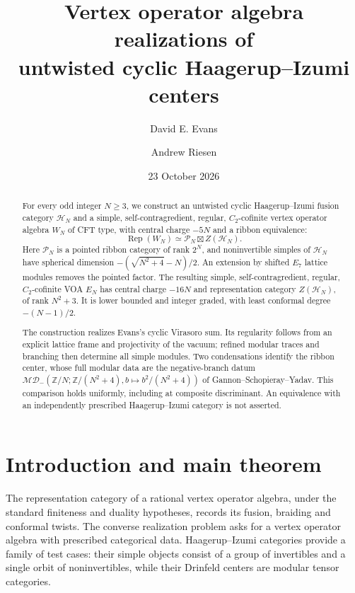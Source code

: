 \documentclass[11pt,a4paper]{article}
\title{\textbf{Vertex operator algebra realizations of\\untwisted cyclic Haagerup--Izumi centers}}
\author{David E. Evans\and Andrew Riesen}
\date{23 October 2026}
\numberwithin{equation}{section}
\theoremstyle{definition}\newtheorem{definition}[theorem]{Definition}
\theoremstyle{remark}\newtheorem{remark}[theorem]{Remark}
\begin{document}
\maketitle
\begin{abstract}
For every odd integer $N\geq3$, we construct an untwisted cyclic
Haagerup--Izumi fusion category $\mathcal H_N$ and a simple,
self-contragredient, regular, $C_2$-cofinite vertex operator algebra
$W_N$ of CFT type, with central charge $-5N$ and a ribbon equivalence:
\[
 \operatorname{Rep}(W_N)\simeq
 \mathcal P_N\boxtimes Z(\mathcal H_N).
\]
Here $\mathcal P_N$ is a pointed ribbon category of rank $2^N$, and
noninvertible simples of $\mathcal H_N$ have spherical dimension
$-(\sqrt{N^2+4}-N)/2$. An extension by shifted $E_7$ lattice modules
removes the pointed factor. The resulting simple, self-contragredient,
regular, $C_2$-cofinite VOA $E_N$ has central charge $-16N$ and
representation category $Z(\mathcal H_N)$, of rank $N^2+3$.
It is lower bounded and integer graded, with least conformal degree
$-(N-1)/2$.

The construction realizes Evans's cyclic Virasoro sum. Its regularity
follows from an explicit lattice frame and projectivity of the vacuum;
refined modular traces and branching then determine all simple modules.
Two condensations identify the ribbon center, whose full modular data
are the negative-branch datum
$\mathcal{MD}_{-}(\mathbb Z/N;\mathbb Z/(N^2+4),b\mapsto b^2/(N^2+4))$
of Gannon--Schopieray--Yadav. This comparison holds uniformly, including
at composite discriminant. An equivalence with an independently
prescribed Haagerup--Izumi category is not asserted.
\end{abstract}


\section{Introduction and main theorem}
\label{sec:intro}

The representation category of a rational vertex operator algebra,
under the standard finiteness and duality hypotheses, records its
fusion, braiding and conformal twists. The converse realization problem
asks for a vertex operator algebra with prescribed categorical data.
Haagerup--Izumi categories provide a family of test cases: their simple
objects consist of a group of invertibles and a single orbit of
noninvertibles, while their Drinfeld centers are modular tensor categories.
\end{document}
